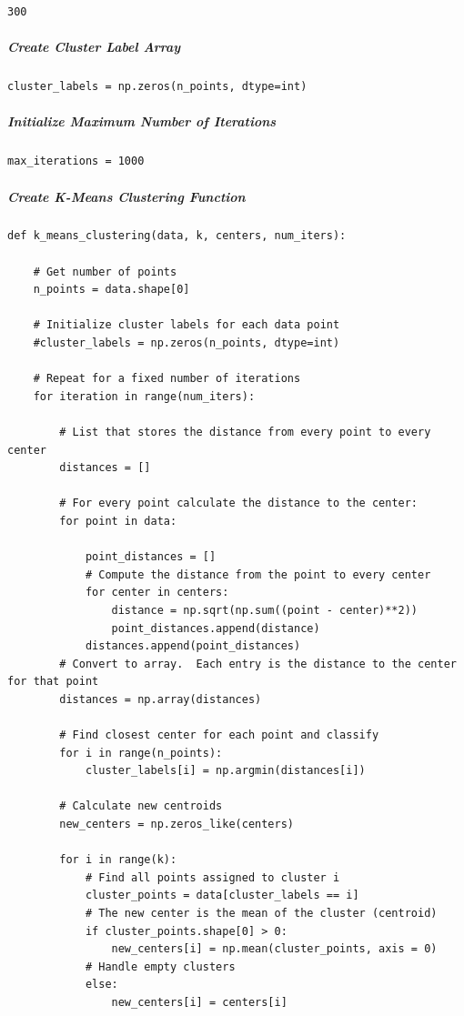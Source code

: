 \begin{verbatim}
300
\end{verbatim}

\subparagraph{Create Cluster Label Array}

\begin{verbatim}
cluster_labels = np.zeros(n_points, dtype=int)
\end{verbatim}

\subparagraph{Initialize Maximum Number of Iterations}

\begin{verbatim}
max_iterations = 1000
\end{verbatim}

\subparagraph{Create K-Means Clustering Function}

\begin{verbatim}
def k_means_clustering(data, k, centers, num_iters):

    # Get number of points
    n_points = data.shape[0]

    # Initialize cluster labels for each data point
    #cluster_labels = np.zeros(n_points, dtype=int)

    # Repeat for a fixed number of iterations
    for iteration in range(num_iters):

        # List that stores the distance from every point to every center
        distances = []

        # For every point calculate the distance to the center:
        for point in data:

            point_distances = []
            # Compute the distance from the point to every center
            for center in centers:
                distance = np.sqrt(np.sum((point - center)**2))
                point_distances.append(distance)
            distances.append(point_distances)
        # Convert to array.  Each entry is the distance to the center for that point
        distances = np.array(distances)

        # Find closest center for each point and classify
        for i in range(n_points):
            cluster_labels[i] = np.argmin(distances[i])

        # Calculate new centroids
        new_centers = np.zeros_like(centers)

        for i in range(k):
            # Find all points assigned to cluster i
            cluster_points = data[cluster_labels == i]
            # The new center is the mean of the cluster (centroid)
            if cluster_points.shape[0] > 0:
                new_centers[i] = np.mean(cluster_points, axis = 0)
            # Handle empty clusters
            else:
                new_centers[i] = centers[i]


\end{verbatim}
